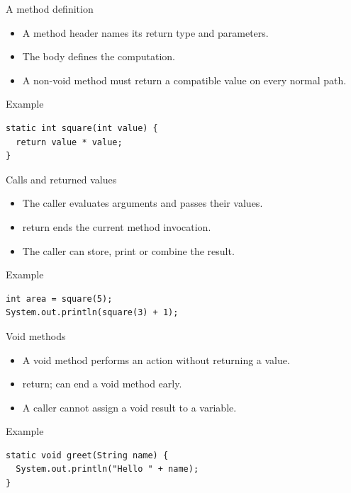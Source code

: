 \documentclass[10pt,aspectratio=169]{beamer}
\begin{document}
\begin{frame}[fragile,t]{A method definition}
\begin{itemize}
\item A method header names its return type and parameters.
\item The body defines the computation.
\item A non-void method must return a compatible value on every normal path.
\end{itemize}
\vspace{1mm}\begin{block}{Example}
\begin{lstlisting}
static int square(int value) {
  return value * value;
}
\end{lstlisting}
\end{block}
\end{frame}

\begin{frame}[fragile,t]{Calls and returned values}
\begin{itemize}
\item The caller evaluates arguments and passes their values.
\item return ends the current method invocation.
\item The caller can store, print or combine the result.
\end{itemize}
\vspace{1mm}\begin{block}{Example}
\begin{lstlisting}
int area = square(5);
System.out.println(square(3) + 1);
\end{lstlisting}
\end{block}
\end{frame}

\begin{frame}[fragile,t]{Void methods}
\begin{itemize}
\item A void method performs an action without returning a value.
\item return; can end a void method early.
\item A caller cannot assign a void result to a variable.
\end{itemize}
\vspace{1mm}\begin{block}{Example}
\begin{lstlisting}
static void greet(String name) {
  System.out.println("Hello " + name);
}
\end{lstlisting}
\end{block}
\end{frame}
\end{document}
